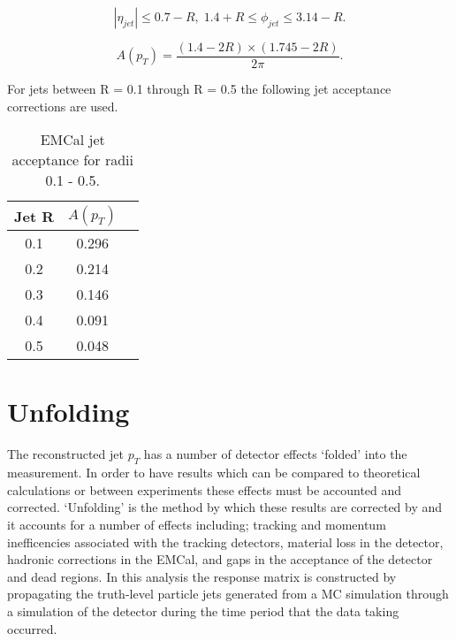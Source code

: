 \begin{equation}
|\eta_{jet}| \leq 0.7 - R, \; 1.4 + R \leq \phi_{jet} \leq 3.14 -R.
\label{eq:jetconstration}
\end{equation}

\begin{equation}
A(p_{T}) = \frac{(1.4 - 2R) \times (1.745 - 2R)}{2 \pi}.
\label{eq:acceptance}
\end{equation}

For jets between R = 0.1 through R = 0.5 the following jet acceptance corrections are used.

\begin{table}[hb]
\label{tab:AcceptanceFactor}
\begin{center}
\begin{tabular}[b]{|c|c|c|}
	\hline
	Jet R & $A(p_{T})$ \\ \hline
	0.1 & 0.296 \\ \hline
	0.2 & 0.214\\ \hline
	0.3 & 0.146\\ \hline
	0.4 & 0.091\\ \hline
	0.5 & 0.048\\ \hline
\end{tabular}
\end{center}
\caption{EMCal jet acceptance for radii 0.1 - 0.5.}
\end{table}








\section{Unfolding}

The reconstructed jet $p_{T}$ has a number of detector effects `folded' into the measurement.  In order to have results which can be compared to theoretical calculations or between experiments these effects must be accounted and corrected.  `Unfolding' is the method by which these results are corrected by and it accounts for a number of effects including; tracking and momentum inefficencies associated with the tracking detectors, material loss in the detector, hadronic corrections in the EMCal, and gaps in the acceptance of the detector and dead regions.  In this analysis the response matrix is constructed by propagating the truth-level particle jets generated from a MC simulation through a simulation of the detector during the time period that the data taking occurred.  

